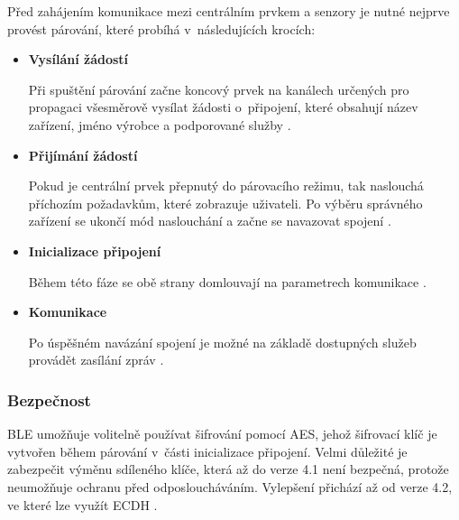   Před zahájením komunikace mezi centrálním prvkem a senzory je nutné nejprve provést párování, 
  které probíhá v~následujících krocích:
  \begin{itemize}
   \item \textbf{Vysílání žádostí}
   
   Při spuštění párování začne koncový prvek na kanálech určených pro propagaci všesměrově vysílat žádosti o~připojení,
   které obsahují název zařízení, jméno výrobce a podporované služby \cite{ble-attack}.
   
   \item \textbf{Přijímání žádostí}
   
   Pokud je centrální prvek přepnutý do párovacího režimu, tak naslouchá příchozím požadavkům, které zobrazuje uživateli.
   Po výběru správného zařízení se ukončí mód naslouchání a začne se navazovat spojení \cite{ble-attack}.
   
   \item \textbf{Inicializace připojení} 
   
   Během této fáze se obě strany domlouvají na parametrech komunikace \cite{ble-attack}.
   \item \textbf{Komunikace}
   
   Po úspěšném navázání spojení je možné na základě dostupných služeb provádět zasílání zpráv \cite{ble-attack}.
  \end{itemize}

 
   \subsubsection{Bezpečnost}
   BLE umožňuje volitelně používat šifrování pomocí AES, jehož šifrovací klíč je 
   vytvořen během párování v~části inicializace připojení. Velmi důležité je zabezpečit 
   výměnu sdíleného klíče, která až do verze 4.1 není bezpečná, protože neumožňuje ochranu
   před odposloucháváním. Vylepšení přichází až od verze 4.2, ve které lze využít ECDH \cite{cesnet-survey}.
   
